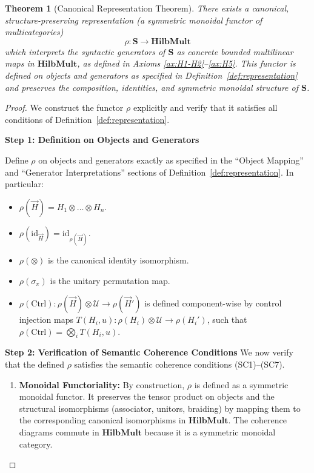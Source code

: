 \documentclass[11pt]{article}
\newtheorem{theorem}{Theorem}
\begin{document}
\begin{theorem}[Canonical Representation Theorem]\label{thm:canonical-representation}
%
There exists a canonical, structure-preserving representation (a symmetric monoidal functor of multicategories)
\[
\rho: \mathbf{S} \to \mathbf{HilbMult}
\]
which interprets the syntactic generators of $\mathbf{S}$ as concrete bounded multilinear maps in $\mathbf{HilbMult}$, as defined in Axioms \ref{ax:H1-H2}--\ref{ax:H5}. This functor is defined on objects and generators as specified in Definition~\ref{def:representation} and preserves the composition, identities, and symmetric monoidal structure of $\mathbf{S}$.
%
\end{theorem}

\begin{proof}
We construct the functor $\rho$ explicitly and verify that it satisfies all conditions of Definition~\ref{def:representation}.

\noindent\textbf{Step 1: Definition on Objects and Generators}

Define $\rho$ on objects and generators exactly as specified in the ``Object Mapping'' and ``Generator Interpretations'' sections of Definition~\ref{def:representation}. In particular:
\begin{itemize}
    \item $\rho(\vec{H}) = H_1 \otimes \dots \otimes H_n$.
    \item $\rho(\mathrm{id}_{\vec{H}}) = \mathrm{id}_{\rho(\vec{H})}$.
    \item $\rho(\otimes)$ is the canonical identity isomorphism.
    \item $\rho(\sigma_{\pi})$ is the unitary permutation map.
    \item $\rho(\mathrm{Ctrl}): \rho(\vec{H}) \otimes \mathcal{U} \to \rho(\vec{H}')$
is defined component-wise by control injection maps 
$T(H_i, u): \rho(H_i) \otimes \mathcal{U} \to \rho(H_i')$, 
such that $\rho(\mathrm{Ctrl}) = \bigotimes_i T(H_i, u)$.
\end{itemize}


\noindent\textbf{Step 2: Verification of Semantic Coherence Conditions}
We now verify that the defined $\rho$ satisfies the semantic coherence conditions (SC1)--(SC7).

\begin{enumerate}[label=(SC\arabic*), leftmargin=*]
    \item \textbf{Monoidal Functoriality:} By construction, $\rho$ is defined as a symmetric monoidal functor. It preserves the tensor product on objects and the structural isomorphisms (associator, unitors, braiding) by mapping them to the corresponding canonical isomorphisms in $\mathbf{HilbMult}$. The coherence diagrams commute in $\mathbf{HilbMult}$ because it is a symmetric monoidal category.
    

\end{enumerate}
\end{proof}
\end{document}
